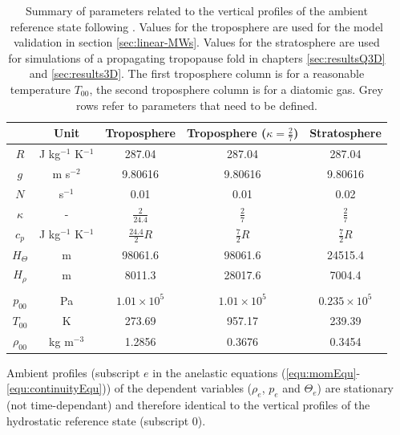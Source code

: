 \begin{table}[ht]
\centering
\caption{Summary of parameters related to the vertical profiles of the ambient reference state following \textcite[]{bacmeister_breakdown_1989}. Values for the troposphere are used for the model validation in section \ref{sec:linear-MWs}. Values for the stratosphere are used for simulations of a propagating tropopause fold in chapters \ref{sec:resultsQ3D} and \ref{sec:results3D}. The first troposphere column is for a reasonable temperature $T_{00}$, the second troposphere column is for a diatomic gas. Grey rows refer to parameters that need to be defined.}
\begin{tabular}{@{}ccccc@{}}
\toprule
 & Unit & Troposphere & Troposphere ($\kappa=\frac{2}{7}$) & Stratosphere \\ \midrule[1pt]

 \rowcolor{LightCyan} $R$ & J kg$^{-1}$ K$^{-1}$ &   \cellcolor{LightCyan} 287.04 &   \cellcolor{LightCyan} 287.04 &   \cellcolor{LightCyan} 287.04 \\
 \rowcolor{LightCyan} $g$ & m s$^{-2}$ & \cellcolor{LightCyan} 9.80616 & \cellcolor{LightCyan} 9.80616 & \cellcolor{LightCyan} 9.80616 \\
 \rowcolor{LightCyan} $N$ & s$^{-1}$ & \cellcolor{LightCyan} 0.01 & \cellcolor{LightCyan} 0.01 & \cellcolor{LightCyan} 0.02 \\
\rowcolor{LightCyan} $\kappa$ & - & $\frac{2}{24.4}$ & $ \frac{2}{7}$ & $ \frac{2}{7}$ \\
$c_p$ & J kg$^{-1}$ K$^{-1}$ & $\frac{24.4}{2} R$ & $\frac{7}{2} R$ & $\frac{7}{2} R$ \\
$H_{\Theta}$ & m & 98061.6 & 98061.6 & 24515.4  \\
$H_{\rho}$ & m & 8011.3  & 28017.6  & 7004.4 \\

& & & & \\
\rowcolor{LightCyan} $p_{00}$ & Pa & \cellcolor{LightCyan} $1.01 \times 10^5$ & \cellcolor{LightCyan} $1.01 \times 10^5$ & \cellcolor{LightCyan} $0.235 \times 10^5$ \\
$T_{00}$ & K & 273.69 & 957.17 & 239.39 \\
$\rho_{00}$ & kg m$^{-3}$ & 1.2856 & 0.3676 & 0.3454 \\

\bottomrule
\end{tabular}
\label{tab:ambientProfiles}
\end{table}

Ambient profiles (subscript $e$ in the anelastic equations (\ref{equ:momEqu}-\ref{equ:continuityEqu})) of the dependent variables ($\rho_e$, $p_e$ and $\Theta_e$) are stationary (not time-dependant) and therefore identical to the vertical profiles of the hydrostatic reference state (subscript 0).

